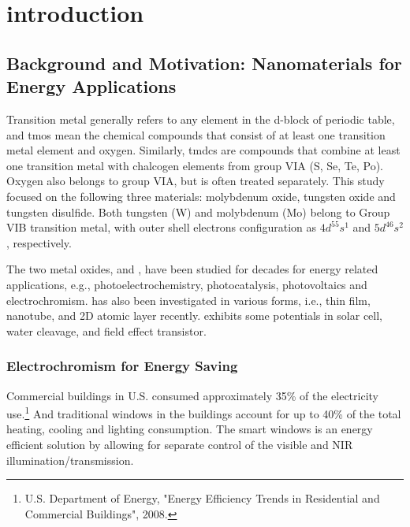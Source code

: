 
\chapter{introduction}

\section{Background and Motivation: Nanomaterials for Energy Applications}

Transition metal generally refers to any element in the d-block of periodic table, and \glspl{tmo} mean the chemical compounds that consist of at least one transition metal element and oxygen. Similarly, \glspl{tmdc} are compounds that combine at least one transition metal with chalcogen elements from group VIA (S, Se, Te, Po). Oxygen also belongs to group VIA, but is often treated separately. This study focused on the following three materials: molybdenum oxide, tungsten oxide and tungsten disulfide. Both tungsten (W) and molybdenum (Mo) belong to Group VIB transition metal, with outer shell electrons configuration as $4d^55s^1$ and $5d^46s^2$, respectively. 
 
The two metal oxides,  and , have been studied for decades for energy related applications, e.g., photoelectrochemistry,\cite{Su2010} photocatalysis,\cite{Watcharenwong2008, Macphee2010} photovoltaics\cite{Coridan2013} and electrochromism.\cite{Yoshimura1985, Mortimer2011}  has also been investigated in various forms, i.e., thin film, nanotube, and 2D atomic layer recently.  exhibits some potentials in solar cell, water cleavage, and field effect transistor. 



\subsection{Electrochromism for Energy Saving}

Commercial buildings in U.S. consumed approximately 35\% of the electricity use.\footnote{U.S. Department of Energy, "Energy Efficiency Trends in Residential and Commercial Buildings", 2008.} And traditional windows in the buildings account for up to 40\% of the total heating, cooling and lighting consumption. The smart windows is an energy efficient solution by allowing for separate control of the visible and NIR illumination/transmission.

